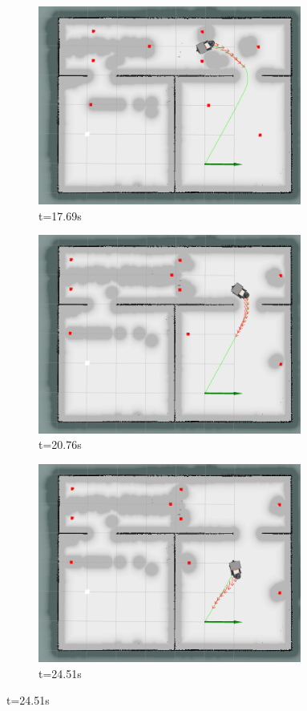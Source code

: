 \begin{figure}[!ht]
\begin{subfigure}[b]{0.35\linewidth}
        \includegraphics[width=0.95\textwidth]{images/teb_double/2/2519.png} \caption{t=17.69s}
    \end{subfigure}%
    \begin{subfigure}[b]{0.35\linewidth}
        \centering
        \includegraphics[width=0.95\textwidth]{images/teb_double/2/2826.png} \caption{t=20.76s}
    \end{subfigure}
    \begin{subfigure}[b]{0.35\linewidth}
        \centering
        \includegraphics[width=0.95\textwidth]{images/teb_double/2/3201.png} \caption{t=24.51s}

\end{subfigure}
\end{figure}
